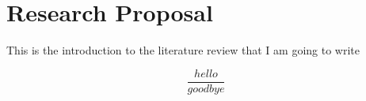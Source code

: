\chapter{Research Proposal}

This is the introduction to the literature review that I am going to write

\begin{equation}
    \frac{hello}{goodbye}
\end{equation}